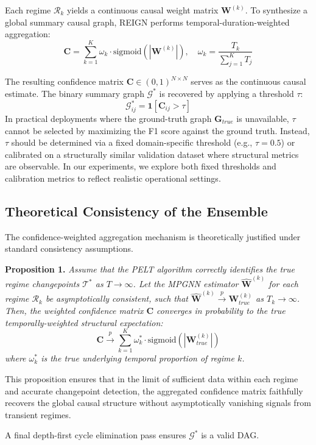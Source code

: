 Each regime $\mathcal{R}_k$ yields a continuous causal weight matrix $\mathbf{W}^{(k)}$. To synthesize a global summary causal graph, REIGN performs temporal-duration-weighted aggregation:
\begin{equation}
    \mathbf{C} = \sum_{k=1}^{K} \omega_k \cdot \text{sigmoid}\left(|\mathbf{W}^{(k)}|\right), \quad \omega_k = \frac{T_k}{\sum_{j=1}^K T_j}
\end{equation}
\begin{revenv}
The resulting confidence matrix $\mathbf{C} \in (0,1)^{N \times N}$ serves as the continuous causal estimate. The binary summary graph $\mathcal{G}^*$ is recovered by applying a threshold $\tau$:
\begin{equation}
    \mathcal{G}^*_{ij} = \mathbf{1}[\mathbf{C}_{ij} > \tau]
\end{equation}
In practical deployments where the ground-truth graph $\mathbf{G}_{true}$ is unavailable, $\tau$ cannot be selected by maximizing the F1 score against the ground truth. Instead, $\tau$ should be determined via a fixed domain-specific threshold (e.g., $\tau = 0.5$) or calibrated on a structurally similar validation dataset where structural metrics are observable. In our experiments, we explore both fixed thresholds and calibration metrics to reflect realistic operational settings.

\subsection{Theoretical Consistency of the Ensemble}

The confidence-weighted aggregation mechanism is theoretically justified under standard consistency assumptions. 

\textbf{Proposition 1.} \textit{Assume that the PELT algorithm correctly identifies the true regime changepoints $\mathcal{T}^*$ as $T \to \infty$. Let the MPGNN estimator $\hat{\mathbf{W}}^{(k)}$ for each regime $\mathcal{R}_k$ be asymptotically consistent, such that $\hat{\mathbf{W}}^{(k)} \xrightarrow{p} \mathbf{W}^{(k)}_{true}$ as $T_k \to \infty$. Then, the weighted confidence matrix $\mathbf{C}$ converges in probability to the true temporally-weighted structural expectation:}
\begin{equation}
    \mathbf{C} \xrightarrow{p} \sum_{k=1}^{K} \omega^*_k \cdot \text{sigmoid}\left(|\mathbf{W}^{(k)}_{true}|\right)
\end{equation}
\textit{where $\omega^*_k$ is the true underlying temporal proportion of regime $k$.}

This proposition ensures that in the limit of sufficient data within each regime and accurate changepoint detection, the aggregated confidence matrix faithfully recovers the global causal structure without asymptotically vanishing signals from transient regimes.
\end{revenv}
A final depth-first cycle elimination pass ensures $\mathcal{G}^*$ is a valid DAG.

